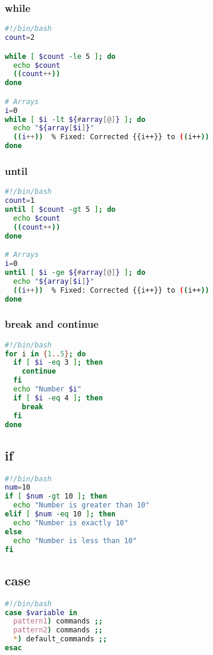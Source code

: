 \documentclass[a4paper,10pt]{article}
\begin{document}
\subsubsection*{while}
\begin{lstlisting}[language=bash]
#!/bin/bash
count=2

while [ $count -le 5 ]; do
  echo $count
  ((count++))
done

# Arrays
i=0 
while [ $i -lt ${#array[@]} ]; do 
  echo "${array[$i]}"
  ((i++))  % Fixed: Corrected {{i++}} to ((i++))
done
\end{lstlisting}

\subsubsection*{until}
\begin{lstlisting}[language=bash]
#!/bin/bash
count=1
until [ $count -gt 5 ]; do
  echo $count
  ((count++))
done

# Arrays 
i=0 
until [ $i -ge ${#array[@]} ]; do 
  echo "${array[$i]}"
  ((i++))  % Fixed: Corrected {{i++}} to ((i++))
done
\end{lstlisting}

\subsubsection*{break and continue}
\begin{lstlisting}[language=bash]
#!/bin/bash
for i in {1..5}; do
  if [ $i -eq 3 ]; then
    continue
  fi
  echo "Number $i"
  if [ $i -eq 4 ]; then
    break
  fi
done
\end{lstlisting}

\subsection{if}
\begin{lstlisting}[language=bash]
#!/bin/bash
num=10
if [ $num -gt 10 ]; then
  echo "Number is greater than 10"
elif [ $num -eq 10 ]; then
  echo "Number is exactly 10"
else
  echo "Number is less than 10"
fi
\end{lstlisting}

\subsection{case}
\begin{lstlisting}[language=bash]
#!/bin/bash
case $variable in
  pattern1) commands ;; 
  pattern2) commands ;; 
  *) default_commands ;;
esac
\end{lstlisting}
\end{document}
